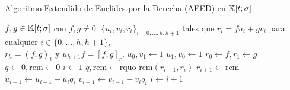 \begin{algorithm}[h] 
    \caption{Algoritmo Extendido de Euclides por la Derecha (AEED) en $\mathbb{K}[t;\sigma]$} \label{alg:eucld}
    \begin{algorithmic}
    \REQUIRE $f,g \in \mathbb{K}[t;\sigma]$ con $f,g \neq 0$.
    \ENSURE $\{u_i,v_i,r_i\}_{i=0,\dots,h,h + 1}$ tales que $r_i = fu_i + gv_i$ para cualquier $i \in \{0,\dots,h,h+1\}$, \\ $r_h = (f,g)_\ell$ y $u_{h+1}f = [f,g]_r$.
    \STATE $u_0,v_1 \longleftarrow 1$
    \STATE $u_1,v_0 \longleftarrow 1$
    \STATE $r_0 \longleftarrow f,r_1 \longleftarrow g$
    \STATE $q \longleftarrow 0, \text{rem} \longleftarrow 0$
    \STATE $i \longleftarrow 1$
    \STATE $q,\text{rem} \longleftarrow \text{rquo-rem}(r_{i-1},r_i)$
    \STATE $r_{i+1} \longleftarrow \text{rem}$
    \STATE $u_{i+1} \longleftarrow u_{i-1} - u_iq_i$
    \STATE $v_{i+1} \longleftarrow v_{i-1} - v_iq_i$
    \STATE $i \longleftarrow i + 1$
    \ENDWHILE
    \end{algorithmic}
\end{algorithm}


